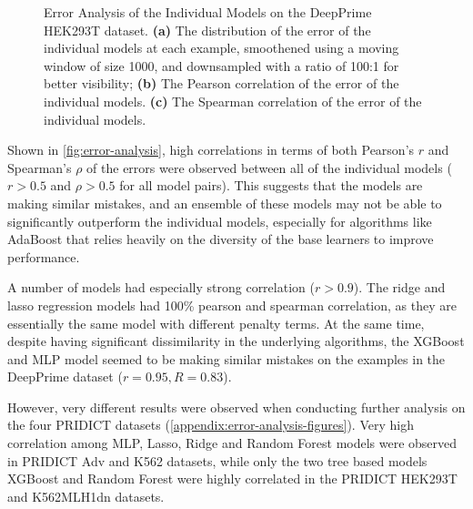 \begin{figure}
    \centering
    \caption[Error Analysis of the Individual Models]{Error Analysis of the Individual Models on the DeepPrime HEK293T dataset. \textbf{(a)} The distribution of the error of the individual models at each example, smoothened using a moving window of size 1000, and downsampled with a ratio of 100:1 for better visibility; \textbf{(b)} The Pearson correlation of the error of the individual models. \textbf{(c)} The Spearman correlation of the error of the individual models.}
    \label{fig:error-analysis}
\end{figure}

Shown in \autoref{fig:error-analysis}, high correlations in terms of both Pearson's $r$ and Spearman's $\rho$ of the errors were observed between all of the individual models ($r>0.5$ and $\rho>0.5$ for all model pairs). This suggests that the models are making similar mistakes, and an ensemble of these models may not be able to significantly outperform the individual models, especially for algorithms like AdaBoost that relies heavily on the diversity of the base learners to improve performance.

A number of models had especially strong correlation ($r>0.9$). The ridge and lasso regression models had 100\% pearson and spearman correlation, as they are essentially the same model with different penalty terms. At the same time, despite having significant dissimilarity in the underlying algorithms, the XGBoost and MLP model seemed to be making similar mistakes on the examples in the DeepPrime dataset ($r=0.95, R=0.83$).

However, very different results were observed when conducting further analysis on the four PRIDICT datasets (\autoref{appendix:error-analysis-figures}). Very high correlation among MLP, Lasso, Ridge and Random Forest models were observed in PRIDICT Adv and K562 datasets, while only the two tree based models XGBoost and Random Forest were highly correlated in the PRIDICT HEK293T and K562MLH1dn datasets.  

